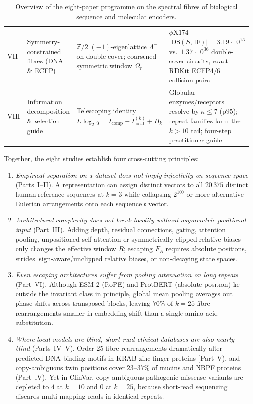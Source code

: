 \documentclass[11pt]{article}
\theoremstyle{plain}
\theoremstyle{definition}
\theoremstyle{remark}
\begin{document}
\begin{table}[t]
\begin{tabular}{>{\raggedright\arraybackslash}p{}>{\raggedright\arraybackslash}p{}>{\raggedright\arraybackslash}p{}>{\raggedright\arraybackslash}p{}}
VII \cite{CC26h} & Symmetry-constrained fibres (DNA \& ECFP) & $\mathbb Z/2$ $(-1)$-eigenlattice $\Lambda^-$ on double cover; coarsened symmetric window $\Omega_r$ & $\phi$X174 $|\mathrm{DS}(S,10)|=3.19\cdot10^{13}$ vs.\ $1.37\cdot10^{36}$ double-cover circuits; exact RDKit ECFP4/6 collision pairs\\
VIII & Information decomposition \& selection guide & Telescoping identity $L\log_2 q = I_{\mathrm{comp}}+I_{\mathrm{local}}^{(k)}+B_k$ & Globular enzymes/receptors resolve by $\kappa\le7$ ($\text{p95}$); repeat families form the $k>10$ tail; four-step practitioner guide\\
\bottomrule
\end{tabular}
\caption{Overview of the eight-paper programme on the spectral fibres of biological sequence and molecular
encoders.}\label{tab:series}
\end{table}

Together, the eight studies establish four cross-cutting principles:
\begin{enumerate}
\item \emph{Empirical separation on a dataset does not imply injectivity on sequence space} (Parts~I--II). A
representation can assign distinct vectors to all $20\,375$ distinct human reference sequences at $k=3$ while
collapsing $2^{100}$ or more alternative Eulerian arrangements onto each sequence's vector.
\item \emph{Architectural complexity does not break locality without asymmetric positional input} (Part~III).
Adding depth, residual connections, gating, attention pooling, unpositioned self-attention or symmetrically clipped
relative biases only changes the effective window $R$; escaping $F_R$ requires absolute positions, strides,
sign-aware/unclipped relative biases, or non-decaying state spaces.
\item \emph{Even escaping architectures suffer from pooling attenuation on long repeats} (Part~VI). Although ESM-2
(RoPE) and ProtBERT (absolute position) lie outside the invariant class in principle, global mean pooling averages
out phase shifts across transposed blocks, leaving $70\%$ of $k=25$ fibre rearrangements smaller in embedding shift
than a single amino acid substitution.
\item \emph{Where local models are blind, short-read clinical databases are also nearly blind} (Parts~IV--V).
Order-$25$ fibre rearrangements dramatically alter predicted DNA-binding motifs in KRAB zinc-finger proteins
(Part~V), and copy-ambiguous twin positions cover $23$--$37\%$ of mucins and NBPF proteins (Part~IV). Yet in
ClinVar, copy-ambiguous pathogenic missense variants are depleted to $4$ at $k=10$ and $0$ at $k=25$, because
short-read sequencing discards multi-mapping reads in identical repeats.
\end{enumerate}
\end{document}
